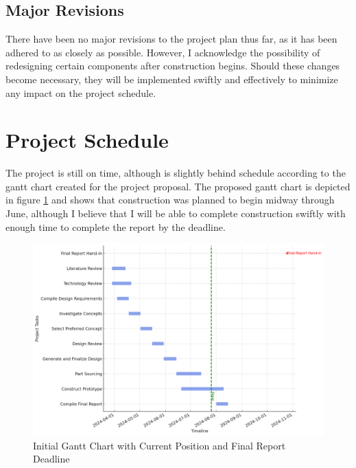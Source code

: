 \subsection{Major Revisions}
There have been no major revisions to the project plan thus far, as it has been adhered to as closely as possible. However, I acknowledge the possibility of redesigning certain components after construction begins. Should these changes become necessary, they will be implemented swiftly and effectively to minimize any impact on the project schedule.


\section{Project Schedule}
The project is still on time, although is slightly behind schedule according to the  gantt chart created for the project proposal. The proposed gantt chart is depicted in figure \ref{fig:initial-gantt} and shows that construction was planned to begin midway through June, although I believe that I will be able to complete construction swiftly with enough time to complete the report by the deadline. 

\begin{figure}[ht]
    \centering
    \includegraphics[width=0.75\linewidth]{figs/gantt_progress.png}
    \caption{Initial Gantt Chart with Current Position and Final Report Deadline}
    \label{fig:initial-gantt}
\end{figure}

